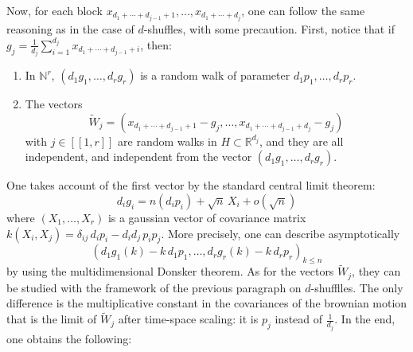 \documentclass[smallextended,nospthms]{svjour3}
\theoremstyle{remark}
\newcommand{\N}{\mathbb{N}}
\newcommand{\R}{\mathbb{R}}
\newcommand{\lle}{\left[\!\left[}
\newcommand{\rre}{\right]\!\right]}
\begin{document}
Now, for each block $x_{d_{1}+\cdots+d_{j-1}+1},\ldots,x_{d_{1}+\cdots+d_{j}}$, one can follow the same reasoning as in the case of $d$-shuffles, with some precaution. First, notice that if $g_{j}=\frac{1}{d_{j}}\sum_{i=1}^{d_{j}} x_{d_{1}+\cdots+d_{j-1}+i}$, then:\vspace{2mm}
\begin{enumerate}
\item In $\N^{r}$, $(d_{1}g_{1},\ldots,d_{r}g_{r})$ is a random walk of parameter $d_{1}p_{1},\ldots,d_{r}p_{r}$.\vspace{2mm}
\item The vectors
$$\widetilde{W}_{j}=(x_{d_{1}+\cdots+d_{j-1}+1}-g_{j},\ldots,x_{d_{1}+\cdots+d_{j-1}+d_{j}}-g_{j})$$
with $j \in \lle 1,r\rre$ are random walks in $H \subset \R^{d_{j}}$, and they are all independent, and independent from the vector $(d_{1}g_{1},\ldots,d_{r}g_{r})$.\vspace{2mm}
\end{enumerate}
One takes account of the first vector by the standard central limit theorem: 
$$d_{i}g_{i}=n(d_{i}p_{i})+\sqrt{n}\,X_{i}+o\left(\sqrt{n}\right)$$
where $(X_{1},\ldots,X_{r})$ is a gaussian vector of covariance matrix $k(X_{i},X_{j})=\delta_{ij}\,d_{i}p_{i}-d_{i}d_{j}\,p_{i}p_{j}$. More precisely, one can describe asymptotically 
$$(d_{1}g_{1}(k)-k\,d_{1}p_{1},\ldots,d_{r}g_{r}(k)-k\,d_{r}p_{r})_{k\leq n}$$ 
by using the multidimensional Donsker theorem. As for the vectors $\widetilde{W}_{j}$, they can be studied with the framework of the previous paragraph on $d$-shufflles. The only difference is the multiplicative constant in the covariances of the brownian motion that is the limit of $\widetilde{W}_{j}$ after time-space scaling: it is $p_{j}$ instead of $\frac{1}{d_{j}}$. In the end, one obtains the following:
\end{document}
